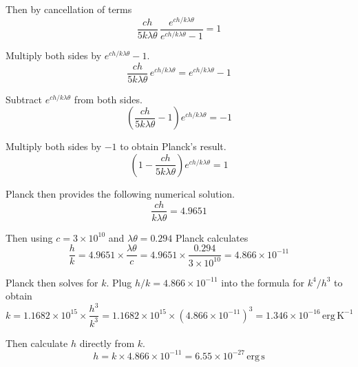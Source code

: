 Then by cancellation of terms
\begin{equation*}
\frac{ch}{5k\lambda\theta}\,\frac{e^{ch/k\lambda\theta}}{e^{ch/k\lambda\theta}-1}=1
\end{equation*}

Multiply both sides by $e^{ch/k\lambda\theta}-1$.
\begin{equation*}
\frac{ch}{5k\lambda\theta}\, e^{ch/k\lambda\theta}
=e^{ch/k\lambda\theta}-1
\end{equation*}

Subtract $e^{ch/k\lambda\theta}$ from both sides.
\begin{equation*}
\left(\frac{ch}{5k\lambda\theta}-1\right)e^{ch/k\lambda\theta}=-1
\end{equation*}

Multiply both sides by $-1$ to obtain Planck's result.
\begin{equation*}
\left(1-\frac{ch}{5k\lambda\theta}\right)e^{ch/k\lambda\theta}=1
\end{equation*}

Planck then provides the following numerical solution.
\begin{equation*}
\frac{ch}{k\lambda\theta}=4.9651
\end{equation*}

Then using $c=3\times10^{10}$ and $\lambda\theta=0.294$ Planck calculates
\begin{equation*}
\frac{h}{k}=4.9651\times\frac{\lambda\theta}{c}=4.9651\times\frac{0.294}{3\times10^{10}}=4.866\times10^{-11}
\end{equation*}

Planck then solves for $k$.
Plug $h/k=4.866\times10^{-11}$ into the formula for $k^4/h^3$ to obtain
\begin{equation*}
k=1.1682\times10^{15}\times\frac{h^3}{k^3}
=1.1682\times10^{15}\times(4.866\times10^{-11})^3=1.346\times10^{-16}\,\text{erg}\,\text{K}^{-1}
\end{equation*}

Then calculate $h$ directly from $k$.
\begin{equation*}
h=k\times4.866\times10^{-11}=6.55\times10^{-27}\,\text{erg}\,\text{s}
\end{equation*}


